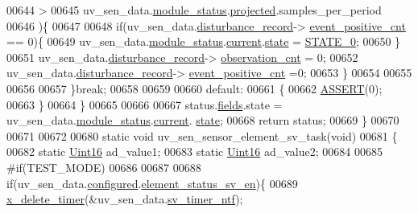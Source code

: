 \begin{DoxyCode}
00644                   >
00645                   uv\_sen\_data.\hyperlink{a00035_a5a53c391562b059eb744ac679f3765ca}{module\_status}.\hyperlink{a00017_a6b2516d74583418cec324c50041421c9}{projected}.samples\_per\_period
00646                )\{
00647 
00648                  \textcolor{keywordflow}{if}(uv\_sen\_data.\hyperlink{a00035_ac9b38e2c1d3f1013a88d33506c754152}{disturbance\_record}->
      \hyperlink{a00028_a7397b9d76d4b57500f27bb23d258a18a}{event\_positive\_cnt} == 0)\{
00649                      uv\_sen\_data.\hyperlink{a00035_a5a53c391562b059eb744ac679f3765ca}{module\_status}.\hyperlink{a00017_ab8af48cdbba92b3ae39c4470e53af944}{current}.\hyperlink{a00017_a6b8d8e916bc56265a3fd279bd26b6d1b}{state} = 
      \hyperlink{a00021_ad6739dbbe5581cac99b7dc8a5e09949c}{STATE\_0}; 
00650                  \}
00651                            uv\_sen\_data.\hyperlink{a00035_ac9b38e2c1d3f1013a88d33506c754152}{disturbance\_record}->
      \hyperlink{a00028_ad5b0bac02ce266b91b2b52a1c3ea1d78}{observation\_cnt}     = 0;
00652                            uv\_sen\_data.\hyperlink{a00035_ac9b38e2c1d3f1013a88d33506c754152}{disturbance\_record}->
      \hyperlink{a00028_a7397b9d76d4b57500f27bb23d258a18a}{event\_positive\_cnt}   =0;
00653                 \}
00654 
00655 
00656 
00657         \}\textcolor{keywordflow}{break};
00658 
00659 
00660         \textcolor{keywordflow}{default}:
00661         \{
00662             \hyperlink{a00072_abb8ff8e213ac9f6fb21d2b968583b936}{ASSERT}(0);
00663         \}
00664     \}
00665 
00666 
00667     status.\hyperlink{a00021_a5296d090c085b0421fdf5a86e382abea}{fields}.state = uv\_sen\_data.\hyperlink{a00035_a5a53c391562b059eb744ac679f3765ca}{module\_status}.\hyperlink{a00017_ab8af48cdbba92b3ae39c4470e53af944}{current}.
      \hyperlink{a00017_a6b8d8e916bc56265a3fd279bd26b6d1b}{state};
00668     \textcolor{keywordflow}{return} status;
00669 \}
00670 
00671 
00672 
00680 \textcolor{keyword}{static} \textcolor{keywordtype}{void} uv\_sen\_sensor\_element\_sv\_task(\textcolor{keywordtype}{void})
00681 \{
00682     \textcolor{keyword}{static} \hyperlink{a00072_a59a9f6be4562c327cbfb4f7e8e18f08b}{Uint16} ad\_value1;
00683     \textcolor{keyword}{static} \hyperlink{a00072_a59a9f6be4562c327cbfb4f7e8e18f08b}{Uint16} ad\_value2;
00684 
00685 \textcolor{preprocessor}{#if(TEST\_MODE)}
00686 
00687 
00688     \textcolor{keywordflow}{if}(uv\_sen\_data.\hyperlink{a00035_a94b2d1f6ea4ab334c74d24984dd27843}{configured}.\hyperlink{a00021_afeb3f74725269028a60926f98890c22b}{element\_status\_sv\_en})\{
00689     \hyperlink{a00036_ab69e9af4cfa717e870d587906283635c}{x\_delete\_timer}(&uv\_sen\_data.\hyperlink{a00035_ada91b200053f2d93e3639dc4ee3415b4}{sv\_timer\_ntf});

\end{DoxyCode}
